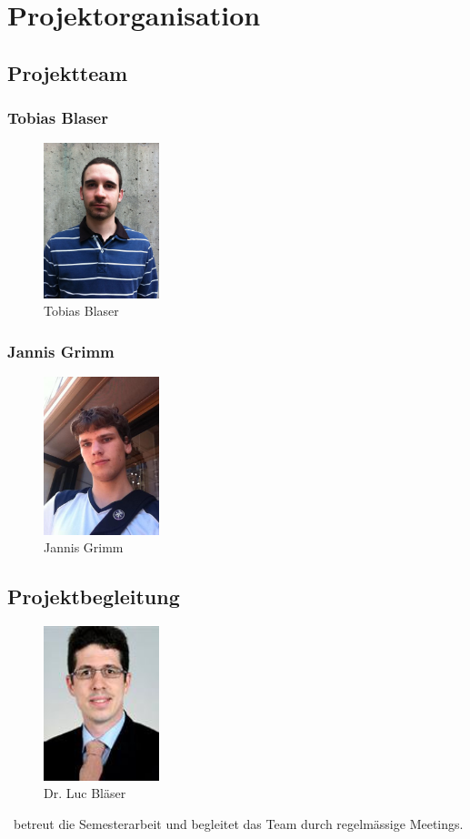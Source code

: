 \chapter{Projektorganisation}

\section{Projektteam}
\subsection*{Tobias Blaser}
\begin{figure}[H]
	\includegraphics[width=0.3\textwidth]{../projektplan/img/tobias.jpg}
	\centering
	\caption{Tobias Blaser}
	\label{fig:tobias}
\end{figure}

\subsection*{Jannis Grimm}
\begin{figure}[H]
	\includegraphics[width=0.3\textwidth]{../projektplan/img/jannis.jpg}
	\centering
	\caption{Jannis Grimm}
	\label{fig:jannis}
\end{figure}

\section{Projektbegleitung}
\begin{figure}[H]
	\includegraphics[width=0.3\textwidth]{../projektplan/img/lblaeser.jpg}
	\centering
	\caption{Dr. Luc Bläser}
	\label{fig:bläser}
\end{figure}
\teacher\ betreut die Semesterarbeit und begleitet das Team durch regelmässige Meetings.
